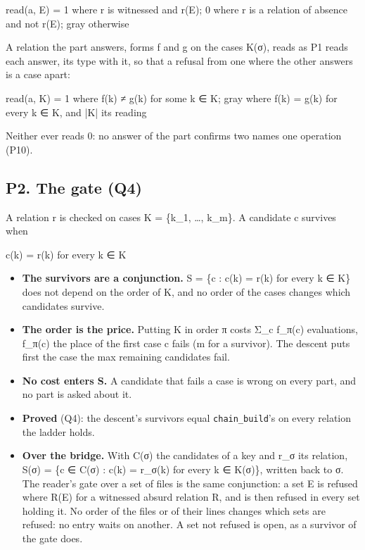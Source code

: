 read(a, E) = 1 where r is witnessed and r(E); 0 where r is a relation of absence and not r(E); gray otherwise

A relation the part answers, forms f and g on the cases K(σ), reads as P1 reads each answer, its type with it, so that a refusal from one where the other answers is a case apart:

read(a, K) = 1 where f(k) ≠ g(k) for some k ∈ K; gray where f(k) = g(k) for every k ∈ K, and |K| its reading

Neither ever reads 0: no answer of the part confirms two names one operation (P10).

\subsection{\texorpdfstring{P2. The gate (Q4)}{P2. The gate (Q4)}}

A relation r is checked on cases K = \{k\_\allowbreak{}1, …, k\_\allowbreak{}m\}. A candidate c survives when

c(k) = r(k) for every k ∈ K

\begin{itemize}
\item \textbf{The survivors are a conjunction.} S = \{c : c(k) = r(k) for every k ∈ K\} does not depend on the order of K, and no order of the cases changes which candidates survive.
\item \textbf{The order is the price.} Putting K in order π costs Σ\_\allowbreak{}c f\_\allowbreak{}π(c) evaluations, f\_\allowbreak{}π(c) the place of the first case c fails (m for a survivor). The descent puts first the case the max remaining candidates fail.
\item \textbf{No cost enters S.} A candidate that fails a case is wrong on every part, and no part is asked about it.
\item \textbf{Proved} (Q4): the descent's survivors equal \texttt{chain\_\allowbreak{}build}'s on every relation the ladder holds.
\item \textbf{Over the bridge.} With C(σ) the candidates of a key and r\_\allowbreak{}σ its relation, S(σ) = \{c ∈ C(σ) : c(k) = r\_\allowbreak{}σ(k) for every k ∈ K(σ)\}, written back to σ. The reader's gate over a set of files is the same conjunction: a set E is refused where R(E) for a witnessed absurd relation R, and is then refused in every set holding it. No order of the files or of their lines changes which sets are refused: no entry waits on another. A set not refused is open, as a survivor of the gate does.
\end{itemize}

